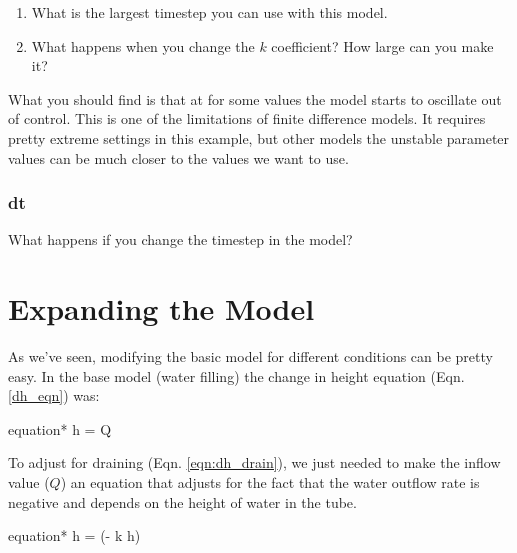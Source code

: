 \documentclass[11pt,fleqn]{book}
\begin{document}
		\begin{enumerate}
			\item What is the largest timestep you can use with this model.
			\item What happens when you change the $k$ coefficient? How large can you make it?
		\end{enumerate}
	
		What you should find is that at for some values the model starts to oscillate out of control. This is one of the limitations of finite difference models. It requires pretty extreme settings in this example, but other models the unstable parameter values can be much closer to the values we want to use.
		
	\subsection{dt}
		What happens if you change the timestep in the model?
	
	
\chapter{Expanding the Model}

	As we've seen, modifying the basic model for different conditions can be pretty easy. In the base model (water filling) the change in height equation (Eqn. \ref{dh_eqn}) was:
	\begin{empheq}[]{equation*}
		\Delta h =  \; Q 
	\end{empheq}
	
	To adjust for draining (Eqn. \ref{eqn:dh_drain}), we just needed to make the inflow value ($Q$) an equation that adjusts for the fact that the water outflow rate is negative and depends on the height of water in the tube.
	\begin{empheq}[]{equation*}
		\Delta h =  \; (- k \cdot h)
	\end{empheq}
	
	
	
\end{document}
